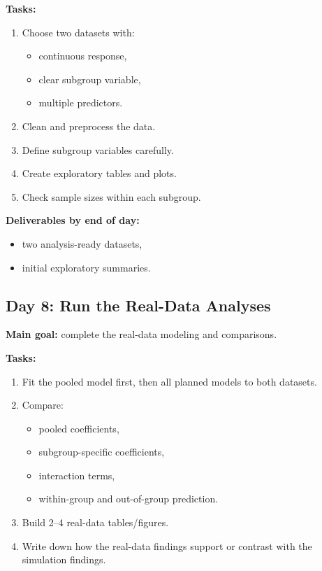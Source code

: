 \documentclass[11pt]{article}
\begin{document}
\textbf{Tasks:}
\begin{enumerate}[label=(\arabic*)]
    \item Choose two datasets with:
    \begin{itemize}
        \item continuous response,
        \item clear subgroup variable,
        \item multiple predictors.
    \end{itemize}
    \item Clean and preprocess the data.
    \item Define subgroup variables carefully.
    \item Create exploratory tables and plots.
    \item Check sample sizes within each subgroup.
\end{enumerate}

\textbf{Deliverables by end of day:}
\begin{itemize}
    \item two analysis-ready datasets,
    \item initial exploratory summaries.
\end{itemize}

\subsection*{Day 8: Run the Real-Data Analyses}
\textbf{Main goal:} complete the real-data modeling and comparisons.

\textbf{Tasks:}
\begin{enumerate}[label=(\arabic*)]
    \item Fit the pooled model first, then all planned models to both datasets.
    \item Compare:
    \begin{itemize}
        \item pooled coefficients,
        \item subgroup-specific coefficients,
        \item interaction terms,
        \item within-group and out-of-group prediction.
    \end{itemize}
    \item Build 2--4 real-data tables/figures.
    \item Write down how the real-data findings support or contrast with the simulation findings.
\end{enumerate}
\end{document}
